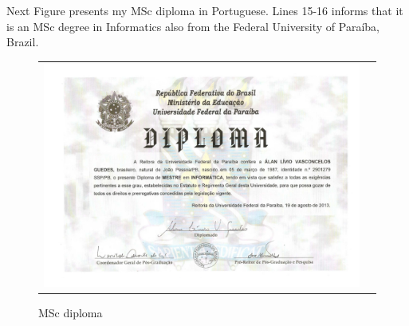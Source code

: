 \documentclass[10pt,a4paper,sans,colorlinks]{moderncv}
\begin{document}
Next Figure presents my MSc diploma in Portuguese.
Lines 15-16 informs that it is an MSc degree in Informatics also from the Federal University of Paraíba, Brazil.

\begin{figure}
  \begin{tabularx}{\textwidth}{X p{1cm}}
    \includegraphics[align=t,width=\textwidth, keepaspectratio]{../static/certificates/msc-diploma.pdf}
  \end{tabularx}
  \caption{MSc diploma}
\end{figure}


\newpage
\end{document}
